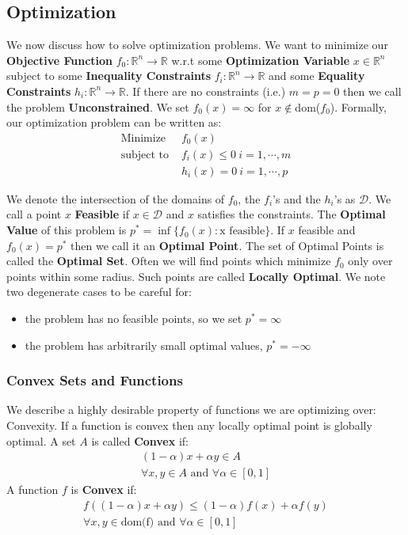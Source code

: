 \documentclass[]{article}
\theoremstyle{mattstyle}
\theoremstyle{definition}
\begin{document}
\newpage

\subsection{Optimization}\label{sec:optim}

We now discuss how to solve optimization problems. We want to minimize our \textbf{Objective Function} $f_0 : \mathbb{R}^n \rightarrow \mathbb{R}$ w.r.t some  \textbf{Optimization Variable} $x \in \mathbb{R}^n$ subject to some \textbf{Inequality Constraints} $f_i: \mathbb{R}^n \rightarrow \mathbb{R}$ and some \textbf{Equality Constraints} $h_i: \mathbb{R}^n \rightarrow \mathbb{R}$. If there are no constraints (i.e.) $m=p=0$ then we call the problem \textbf{Unconstrained}. We set $f_0(x) = \infty$ for $x \notin$dom($f_0$).
Formally, our optimization problem can be written as:
\begin{align*}
\text{Minimize } & f_0(x) \\
\text{subject to } & f_i(x) \le 0 \ i = 1, \cdots, m\\
& h_i(x) = 0 \ i = 1, \cdots, p
\end{align*}

We denote the intersection of the domains of $f_0$, the $f_i$'s and the $h_i$'s as $\mathcal{D}$. We call a point $x$ \textbf{Feasible} if $x\in \mathcal{D}$ and $x$ satisfies the constraints. The \textbf{Optimal Value} of this problem is $p^*=\inf\{f_0(x): \text{x feasible}\}$. If $x$ feasible and $f_0(x) = p^*$ then we call it an \textbf{Optimal Point}. The set of Optimal Points is called the \textbf{Optimal Set}. Often we will find points which minimize $f_0$ only over points within some radius. Such points are called \textbf{Locally Optimal}.
We note two degenerate cases to be careful for:
\begin{itemize}
	\item the problem has no feasible points, so we set $p^*=\infty$
	\item the problem has arbitrarily small optimal values, $p^*=-\infty$
\end{itemize}

\subsubsection{Convex Sets and Functions}

We describe a highly desirable property of functions we are optimizing over: Convexity. If a function is convex then any locally optimal point is globally optimal.
A set $A$ is called \textbf{Convex} if:
\begin{align*}
(1-\alpha)x + \alpha y \in A \\
\forall x,y\in A \text{ and } \forall\alpha \in [0,1]
\end{align*} 
A function $f$ is \textbf{Convex} if:
\begin{align*}
f((1-\alpha)x + \alpha y) \le (1-\alpha)f(x) + \alpha f(y)\\
\forall x,y\in \text{dom(f)}\text{ and } \forall\alpha \in [0,1]
\end{align*} 
\end{document}
